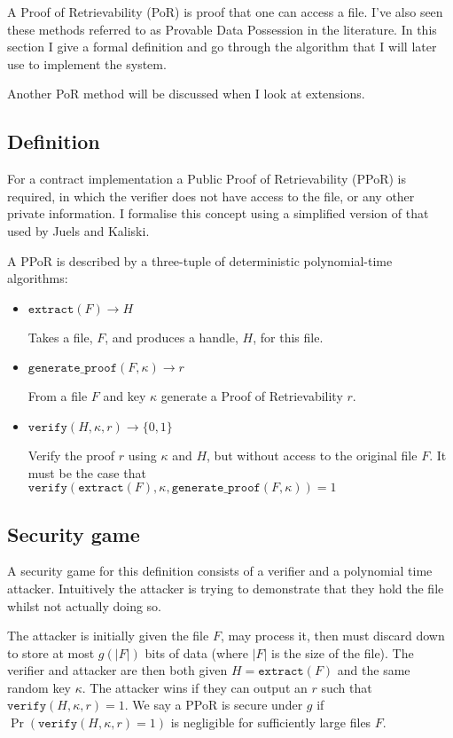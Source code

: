 \documentclass[12pt,a4paper,twoside,openright]{report}
\begin{document}
A Proof of Retrievability (PoR) is proof that one can access a file.
I've also seen these methods referred to as Provable Data Possession in the literature.
In this section I give a formal definition and go through the algorithm that I will
later use to implement the system.

Another PoR method will be discussed when I look at extensions.

\subsection{Definition}


For a contract implementation a Public Proof of Retrievability (PPoR) is required, in which the verifier does not have access to the file,
or any other private information.
I formalise this concept using a simplified version of that used by Juels and Kaliski\cite{ecc-por}.

A PPoR is described by a three-tuple of deterministic polynomial-time algorithms:


\begin{itemize}
\item $\texttt{extract}(F) \to {H}$

Takes a file, $F$, and produces a handle, ${H}$, for this file.


\item $\texttt{generate\_proof}(F, \kappa) \to r$

From a file $F$ and key $\kappa$ generate a Proof of Retrievability $r$.

\item $\texttt{verify}({H}, \kappa, r) \to \{0, 1\}$

Verify the proof $r$ using $\kappa$ and ${H}$, but without access to the original file $F$.
It must be the case that $\texttt{verify}(\texttt{extract}(F), \kappa, \texttt{generate\_proof}(F, \kappa)) = 1$
\end{itemize}



\subsection{Security game}\label{security-game}

A security game for this definition consists of a verifier and a polynomial time attacker.
Intuitively the attacker is trying to demonstrate that they hold the file whilst not actually doing so.

The attacker is initially given the file $F$, may process it, then must discard down to store at most $g(|F|)$ bits of data (where $|F|$ is the size of the file).
The verifier and attacker are then both given ${H} = \texttt{extract}(F)$ and the same random key $\kappa$.
The attacker wins if they can output an $r$ such that $\texttt{verify}({H}, \kappa, r) = 1$.
We say a PPoR is secure under $g$ if $\Pr (\texttt{verify}({H}, \kappa, r) = 1)$ is negligible for sufficiently large files $F$.
\end{document}
